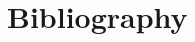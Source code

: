 \documentclass[10pt,twoside]{book}
\begin{document}
% 

% 

% 

\chapter{Bibliography}
\clearpage
\begin{multicols}{2}
\printbibliography[heading=none]
\end{multicols}

% 
\end{document}
